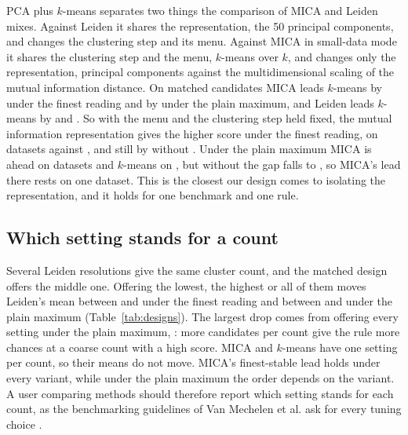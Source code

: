 PCA plus $k$-means separates two things the comparison of MICA and Leiden mixes. Against Leiden it shares
the representation, the 50 principal components, and changes the clustering step and its menu. Against
MICA in small-data mode it shares the clustering step and the menu, $k$-means over $k$, and changes only
the representation, principal components against the multidimensional scaling of the mutual information
distance. On matched candidates MICA leads $k$-means by  under the finest
reading and by  under the plain maximum, and Leiden leads $k$-means by
 and . So with the menu and the clustering step held fixed, the mutual information representation gives the higher score under the finest reading, on  datasets against , and still by  without . Under the plain maximum MICA is ahead on  datasets and $k$-means on , but without  the gap falls to , so MICA's lead there rests on one dataset. This is the
closest our design comes to isolating the representation, and it holds for one benchmark and one rule.



\subsection{Which setting stands for a count}\label{sec:variants}
Several Leiden resolutions give the same cluster count, and the matched design offers the middle one.
Offering the lowest, the highest or all of them moves Leiden's mean between  and
 under the finest reading and between  and
 under the plain maximum (Table~\ref{tab:designs}). The largest drop comes from
offering every setting under the plain maximum, : more candidates per count give the
rule more chances at a coarse count with a high score. MICA and $k$-means have one setting per count, so
their means do not move. MICA's finest-stable lead holds under every variant, while under the plain
maximum the order depends on the variant. A user comparing methods should therefore report which setting
stands for each count, as the benchmarking guidelines of Van Mechelen et al. ask for every tuning choice
\cite{vanmechelen2023white}.

